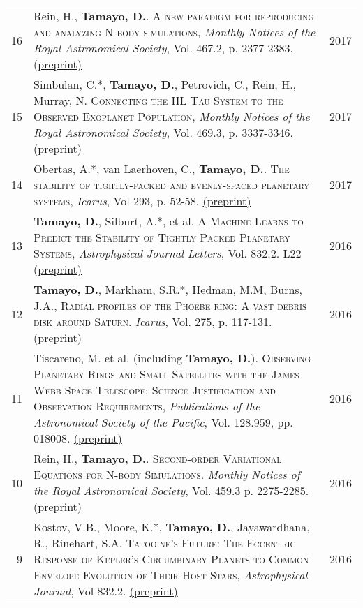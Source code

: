\documentclass[10pt]{article} %
\begin{document}
{\begin{tabular}{>{\hfill}r|p{14.3cm}l}
16 & Rein, H., {\bf Tamayo, D.}. \textsc{A new paradigm for reproducing and analyzing N-body simulations}, {\it Monthly Notices of the Royal Astronomical Society}, Vol. 467.2, p. 2377-2383. \href{https://arxiv.org/abs/1701.07423}{(preprint)} & 2017 \\

15 & Simbulan, C.*, {\bf Tamayo, D.}, Petrovich, C., Rein, H., Murray, N. \textsc{Connecting the HL Tau System to the Observed Exoplanet Population}, {\it Monthly Notices of the Royal Astronomical Society}, Vol. 469.3, p. 3337-3346. \href{https://arxiv.org/abs/1703.09132}{(preprint)} & 2017 \\

14 & Obertas, A.*, van Laerhoven, C., {\bf Tamayo, D.}. \textsc{The stability of tightly-packed and evenly-spaced planetary systems}, {\it Icarus}, Vol 293, p. 52-58. \href{https://arxiv.org/abs/1703.08426}{(preprint)} & 2017 \\

13 & {\bf Tamayo, D.}, Silburt, A.*, et al. \textsc{A Machine Learns to Predict the Stability of Tightly Packed Planetary Systems}, {\it Astrophysical Journal Letters}, Vol. 832.2. L22 \href{https://arxiv.org/abs/1610.05359}{(preprint)}& 2016 \\

12 & {\bf Tamayo, D.}, Markham, S.R.*, Hedman, M.M, Burns, J.A., \textsc{Radial profiles of the Phoebe ring: A vast debris disk around Saturn}.  {\it Icarus}, Vol. 275, p. 117-131. \href{http://arxiv.org/abs/1604.03119}{(preprint)} & 2016 \\

11 & Tiscareno, M. et al. (including {\bf Tamayo, D.}). \textsc{Observing Planetary Rings and Small Satellites with the James Webb Space Telescope: Science Justification and Observation Requirements}, {\it Publications of the Astronomical Society of the Pacific}, Vol. 128.959, pp. 018008. \href{https://arxiv.org/abs/1403.6849v3}{(preprint)} & 2016 \\

10 & Rein, H., {\bf Tamayo, D.}. \textsc{Second-order Variational Equations for N-body Simulations.} {\it Monthly Notices of the Royal Astronomical Society}, Vol. 459.3 p. 2275-2285. \href{http://arxiv.org/abs/1603.03424}{(preprint)} & 2016 \\

9 & Kostov, V.B., Moore, K.*, {\bf Tamayo, D.}, Jayawardhana, R., Rinehart, S.A. \textsc{Tatooine's Future: The Eccentric Response of Kepler's Circumbinary Planets to Common-Envelope Evolution of Their Host Stars}, {\it Astrophysical Journal}, Vol 832.2. \href{https://arxiv.org/abs/1610.03436}{(preprint)} & 2016 \\


\end{tabular}}
\end{document}
